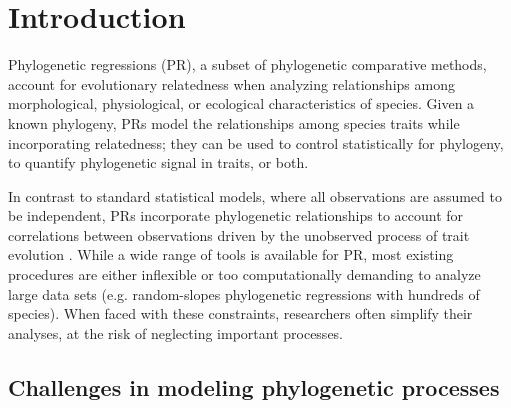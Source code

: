 \documentclass[12pt]{article}
\begin{document}
\doublespacing



\section*{Introduction}

Phylogenetic regressions (PR), a subset of phylogenetic comparative methods, account for evolutionary relatedness when analyzing relationships among morphological, physiological, or ecological characteristics of species.
Given a known phylogeny, PRs model the relationships among species traits while incorporating relatedness; they can be used to control statistically for phylogeny, to quantify phylogenetic signal in traits, or both. 

In contrast to standard statistical models, where all observations are assumed to be independent, PRs incorporate phylogenetic relationships to account for correlations between observations driven by the unobserved process of trait evolution \citep{felsenstein1985phylogenies, butler2004phylogenetic, hansen2012interpreting}. 
While a wide range of tools is available for PR, most existing procedures are either inflexible or too computationally demanding to analyze large data sets (e.g. random-slopes phylogenetic regressions with hundreds of species).
When faced with these constraints, researchers often simplify their analyses, at the risk of neglecting important processes.

\subsection*{Challenges in modeling phylogenetic processes}
\end{document}
